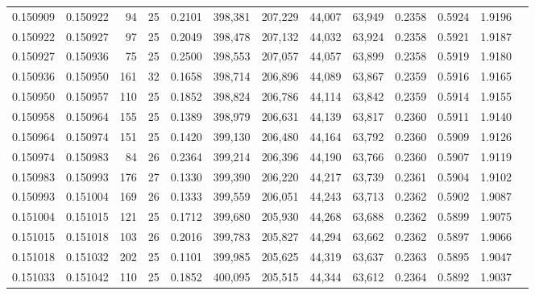 \begin{tabular}{rrrrrrrrrrrrr}
0.150909 & 0.150922 &  94 &  25 &                                     0.2101 & 398,381 & 207,229 &  44,007 &  63,949 & 0.2358 & 0.5924 & 1.9196 \\
0.150922 & 0.150927 &  97 &  25 &                                     0.2049 & 398,478 & 207,132 &  44,032 &  63,924 & 0.2358 & 0.5921 & 1.9187 \\
0.150927 & 0.150936 &  75 &  25 &                                     0.2500 & 398,553 & 207,057 &  44,057 &  63,899 & 0.2358 & 0.5919 & 1.9180 \\
0.150936 & 0.150950 & 161 &  32 &                                     0.1658 & 398,714 & 206,896 &  44,089 &  63,867 & 0.2359 & 0.5916 & 1.9165 \\
0.150950 & 0.150957 & 110 &  25 &                                     0.1852 & 398,824 & 206,786 &  44,114 &  63,842 & 0.2359 & 0.5914 & 1.9155 \\
0.150958 & 0.150964 & 155 &  25 &                                     0.1389 & 398,979 & 206,631 &  44,139 &  63,817 & 0.2360 & 0.5911 & 1.9140 \\
0.150964 & 0.150974 & 151 &  25 &                                     0.1420 & 399,130 & 206,480 &  44,164 &  63,792 & 0.2360 & 0.5909 & 1.9126 \\
0.150974 & 0.150983 &  84 &  26 &                                     0.2364 & 399,214 & 206,396 &  44,190 &  63,766 & 0.2360 & 0.5907 & 1.9119 \\
0.150983 & 0.150993 & 176 &  27 &                                     0.1330 & 399,390 & 206,220 &  44,217 &  63,739 & 0.2361 & 0.5904 & 1.9102 \\
0.150993 & 0.151004 & 169 &  26 &                                     0.1333 & 399,559 & 206,051 &  44,243 &  63,713 & 0.2362 & 0.5902 & 1.9087 \\
0.151004 & 0.151015 & 121 &  25 &                                     0.1712 & 399,680 & 205,930 &  44,268 &  63,688 & 0.2362 & 0.5899 & 1.9075 \\
0.151015 & 0.151018 & 103 &  26 &                                     0.2016 & 399,783 & 205,827 &  44,294 &  63,662 & 0.2362 & 0.5897 & 1.9066 \\
0.151018 & 0.151032 & 202 &  25 &                                     0.1101 & 399,985 & 205,625 &  44,319 &  63,637 & 0.2363 & 0.5895 & 1.9047 \\
0.151033 & 0.151042 & 110 &  25 &                                     0.1852 & 400,095 & 205,515 &  44,344 &  63,612 & 0.2364 & 0.5892 & 1.9037 \\

\end{tabular}
